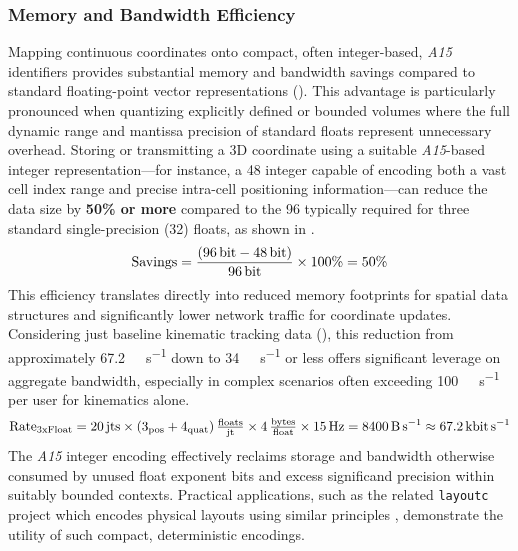 \documentclass[10pt]{article}
\def\AAAB{\textit{A15}}
\begin{document}
\subsubsection{Memory and Bandwidth Efficiency}\label{subsubsec:benefits-efficiency}
Mapping continuous coordinates onto compact, often integer-based, \AAAB{} identifiers provides substantial memory and bandwidth savings compared to standard floating-point vector representations (). This advantage is particularly pronounced when quantizing explicitly defined or bounded volumes where the full dynamic range and mantissa precision of standard floats represent unnecessary overhead. Storing or transmitting a 3D coordinate using a suitable \AAAB{}-based integer representation—for instance, a \SI{48}{\bit} integer capable of encoding both a vast cell index range and precise intra-cell positioning information—can reduce the data size by \textbf{50\% or more} compared to the \SI{96}{\bit} typically required for three standard single-precision (\SI{32}{\bit}) floats, as shown in .
\begin{equation} \label{eq:efficiency-memory}
    \text{Savings} = \frac{(\SI{96}{\bit} - \SI{48}{\bit})}{\SI{96}{\bit}} \times 100\% = 50\%
\end{equation}
This efficiency translates directly into reduced memory footprints for spatial data structures and significantly lower network traffic for coordinate updates. Considering just baseline kinematic tracking data (), this reduction from approximately \SI{67.2}{\kilo\bit\per\second} down to \SI{34}{\kilo\bit\per\second} or less offers significant leverage on aggregate bandwidth, especially in complex scenarios often exceeding \SI{100}{\kilo\bit\per\second} per user for kinematics alone.
\begin{equation} \label{eq:bandwidth-baseline}
    \text{Rate}_{\text{3xFloat}} = 20\,\text{jts} \times (3_{\text{pos}} + 4_{\text{quat}})\,\tfrac{\text{floats}}{\text{jt}} \times 4\,\tfrac{\text{bytes}}{\text{float}} \times \SI{15}{\hertz} = \SI{8400}{\byte\per\second} \approx \SI{67.2}{\kilo\bit\per\second}
\end{equation}
The \AAAB{} integer encoding effectively reclaims storage and bandwidth otherwise consumed by unused float exponent bits and excess significand precision within suitably bounded contexts. Practical applications, such as the related \texttt{layoutc} project which encodes physical layouts using similar principles \cite{Risinger2024Layoutc}, demonstrate the utility of such compact, deterministic encodings.
\end{document}
